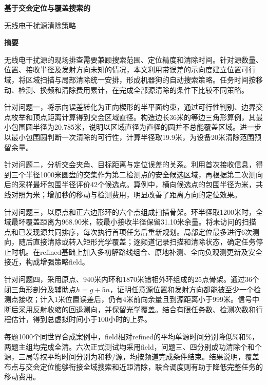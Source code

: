 \documentclass[UTF8,fontset=fandol,a4paper,zihao=-4]{ctexart}
\begin{document}
\begin{center}
{\LARGE\bfseries 基于交会定位与覆盖搜索的\par 无线电干扰源清除策略\par}
\vspace{0.7em}
{\large\bfseries 摘要}
\end{center}
\hspace*{2em}无线电干扰源的现场排查需要兼顾搜索范围、定位精度和清除时间。针对源数量、位置、接收半径及发射方向未知的情况，本文利用带误差的示向度建立位置可行域，将区域扫描与局部清除统一安排，形成机器狗的自动搜索策略。任务时间按移动、检测、换频和清除费用累计，在完成全部源清除的条件下比较不同策略。

针对问题一，将示向误差转化为正向楔形的半平面约束，通过可行性判别、边界交点枚举和顶点距离计算得到交会区域直径。构造边长36米的等边三角形算例，其最小包围圆半径为20.785米，说明以区域直径为直径的圆并不总能覆盖区域。进一步以最小包围圆判断一次清除的可行性，计算半径取19.9米，为设备20米清除范围预留余量。

针对问题二，分析交会夹角、目标距离与定位误差的关系。利用首次接收信息，得到三个半径1000米圆盘的交集作为第二检测点的安全候选区域，再根据第二次测向后的采样最坏包围半径评价42个候选点。算例中，横向候选点的包围半径为\QTwoRadius{}米，共线对照为\QTwoControlRadius{}米；增加\QTwoExtraCost{}秒的移动与检测费用，明显改善了距离方向的定位效果。

针对问题三，以原点和正六边形环的六个点组成扫描骨架。环半径取1200米时，全域最坏覆盖距离为968.90米，较最小接收半径保留31.10米余量。将未访问的扫描点和已发现源共同排序，每次执行首项任务后重新规划。局部定位最多进行6次测向，随后直接清除或转入矩形光学覆盖；逐频道记录扫描和清除状态，确定任务停止时机。在refined基础上加入多初解路线组合、原地补测、全向负观测更新及安全接近，构成增强策略field。

针对问题四，采用原点、940米内环和1870米错相外环组成的25点骨架。通过36个闭三角形剖分及辅助点$h=g+5n$，证明任意源位置和发射方向都能被至少一个检测点接收；计入1米位置误差后，仍有4米前向余量且到源距离小于999米。信号中断后采用反射收缩的回退测向，并保留光学覆盖。结合有限任务数、检测次数和行程估计，得到总虚拟时间小于100小时的上界。

每题1000个同世界合成案例中，field相对refined的平均单源时间分别降低\QThreeGain\%和\QFourGain\%，两题主组均完成全清。六次正式测试均采用field，问题三、四分别成功清除\FormalThreeK{}个和\FormalFourK{}个源，三局等权平均时间分别为\FormalThreeMean{}和\FormalFourMean{}秒/源，均按频道完成条件结束。结果说明，覆盖布点与交会定位能够衔接全域搜索和近距清除，联合调度则有助于降低完整任务的移动费用。
\end{document}
